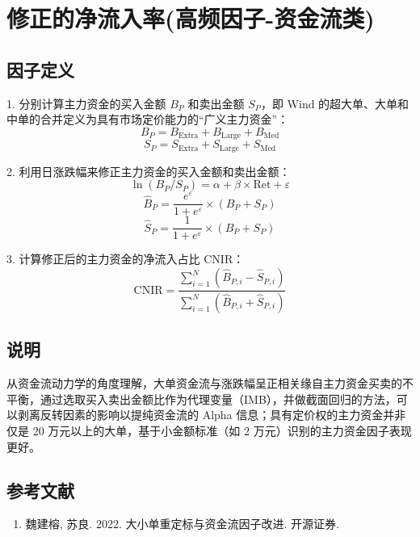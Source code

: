 \documentclass{article}
\begin{document}
\section{修正的净流入率(高频因子-资金流类)}

\subsection{因子定义}

1. 分别计算主力资金的买入金额 \( B_P \) 和卖出金额 \( S_P \)，即 Wind 的超大单、大单和中单的合并定义为具有市场定价能力的“广义主力资金”：
\begin{equation}
    B_P = B_{\mathrm{Extra}} + B_{\mathrm{Large}} + B_{\mathrm{Med}}
\end{equation}
\begin{equation}
    S_P = S_{\mathrm{Extra}} + S_{\mathrm{Large}} + S_{\mathrm{Med}}
\end{equation}

2. 利用日涨跌幅来修正主力资金的买入金额和卖出金额：
\begin{equation}
    \ln(B_P / S_P) = \alpha + \beta \times \mathrm{Ret} + \varepsilon
\end{equation}
\begin{equation}
    \hat{B}_P = \frac{e^{\varepsilon}}{1 + e^{\varepsilon}} \times (B_P + S_P)
\end{equation}
\begin{equation}
    \hat{S}_P = \frac{1}{1 + e^{\varepsilon}} \times (B_P + S_P)
\end{equation}

3. 计算修正后的主力资金的净流入占比 \( \mathrm{CNIR} \)：
\begin{equation}
    \mathrm{CNIR} = \frac{\sum_{i=1}^N (\hat{B}_{P,i} - \hat{S}_{P,i})}{\sum_{i=1}^N (\hat{B}_{P,i} + \hat{S}_{P,i})}
\end{equation}

\subsection{说明}
从资金流动力学的角度理解，大单资金流与涨跌幅呈正相关缘自主力资金买卖的不平衡，通过选取买入卖出金额比作为代理变量（IMB），并做截面回归的方法，可以剥离反转因素的影响以提纯资金流的 Alpha 信息；具有定价权的主力资金并非仅是 20 万元以上的大单，基于小金额标准（如 2 万元）识别的主力资金因子表现更好。

\subsection{参考文献}
\begin{enumerate}
    \item 魏建榕, 苏良. 2022. 大小单重定标与资金流因子改进. 开源证券.
\end{enumerate}
\end{document}
